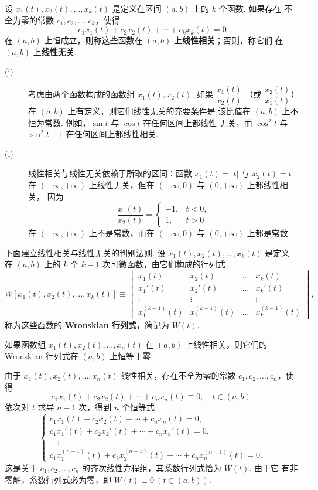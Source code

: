 \begin{deff}
设 $x_1(t),x_2(t),\dots,x_k(t)$ 是定义在区间 $(a,b)$ 上的 $k$ 个函数. 如果存在
不全为零的常数 $c_1,c_2,\dots,c_k$，使得
\[
c_1x_1(t)+c_2x_2(t)+\cdots+c_kx_k(t)=0
\]
在 $(a,b)$ 上恒成立，则称这些函数在 $(a,b)$ 上\textbf{线性相关}；否则，称它们
在 $(a,b)$ 上\textbf{线性无关}.
\end{deff}

\begin{rmk}
\begin{description}
    \item[(i)] 考虑由两个函数构成的函数组 $x_1(t),x_2(t)$. 如果 $\dfrac{x_1(t)}{x_2(t)}$
（或 $\dfrac{x_2(t)}{x_1(t)}$）在 $(a,b)$ 上有定义，则它们线性无关的充要条件是
该比值在 $(a,b)$ 上不恒为常数. 例如，$\sin t$ 与 $\cos t$ 在任何区间上都线性
无关，而 $\cos^2t$ 与 $\sin^2t-1$ 在任何区间上都线性相关. 
    \item[(i)] 线性相关与线性无关依赖于所取的区间：函数 $x_1(t)=|t|$ 与 $x_2(t)=t$ 在
$(-\infty,+\infty)$ 上线性无关，但在 $(-\infty,0)$ 与 $(0,+\infty)$ 上都线性相关，
因为
\[
\frac{x_1(t)}{x_2(t)}=
\begin{cases}
-1, & t<0,\\
1, & t>0
\end{cases}
\]
在 $(-\infty,+\infty)$ 上不是常数，而在 $(-\infty,0)$ 与 $(0,+\infty)$ 上都是常数.
\end{description}
\end{rmk}

下面建立线性相关与线性无关的判别法则. 设 $x_1(t),x_2(t),\dots,x_k(t)$ 是定义
在 $(a,b)$ 上的 $k$ 个 $k-1$ 次可微函数，由它们构成的行列式
\[
W[x_1(t),x_2(t),\dots,x_k(t)]\equiv
\begin{vmatrix}
x_1(t) & x_2(t) & \dots & x_k(t)\\
x_1'(t) & x_2'(t) & \dots & x_k'(t)\\
\vdots & \vdots & & \vdots\\
x_1^{(k-1)}(t) & x_2^{(k-1)}(t) & \dots & x_k^{(k-1)}(t)
\end{vmatrix},
\]
称为这些函数的 \textbf{Wronskian 行列式}，简记为 $W(t)$.

\begin{thm}\label{thm:3.2.3}
如果函数组 $x_1(t),x_2(t),\dots,x_n(t)$ 在 $(a,b)$ 上线性相关，则它们的
Wronskian 行列式在 $(a,b)$ 上恒等于零.
\end{thm}
\begin{pf1}
由于 $x_1(t),x_2(t),\dots,x_n(t)$ 线性相关，存在不全为零的常数 $c_1,c_2,\dots,c_n$，使得
\[
c_1x_1(t)+c_2x_2(t)+\cdots+c_nx_n(t)\equiv0,\quad t\in(a,b).
\]
依次对 $t$ 求导 $n-1$ 次，得到 $n$ 个恒等式
\[
\begin{cases}
c_1x_1(t)+c_2x_2(t)+\cdots+c_nx_n(t)=0,\\
c_1x_1'(t)+c_2x_2'(t)+\cdots+c_nx_n'(t)=0,\\
\quad\vdots\\
c_1x_1^{(n-1)}(t)+c_2x_2^{(n-1)}(t)+\cdots+c_nx_n^{(n-1)}(t)=0.
\end{cases}
\]
这是关于 $c_1,c_2,\dots,c_n$ 的齐次线性方程组，其系数行列式恰为 $W(t)$. 由于它
有非零解，系数行列式必为零，即 $W(t)\equiv0\ (t\in(a,b))$.
\end{pf1}

